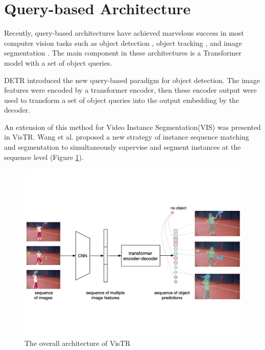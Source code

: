 \section{Query-based Architecture}
Recently, query-based architectures have achieved marvelous success in most computer vision tasks such as object detection \cite{carion_end--end_2020}, object tracking \cite{meinhardt_trackformer_2022}, and image segmentation \cite{cheng_masked-attention_2022, cheng_per-pixel_2021}. The main component in these architectures is a Transformer model with a set of object queries. 

\vspace{-2mm}
DETR \cite{carion_end--end_2020} introduced the new query-based paradigm for object detection. The image features were encoded by a transformer encoder, then these encoder output were used to transform a set of object queries into the output embedding by the decoder. 

\vspace{-2mm}
An extension of this method for Video Instance Segmentation(VIS) was presented in VisTR. Wang et al. \cite{wang_end--end_2021} proposed a new strategy of instance sequence matching and segmentation to simultaneously supervise and segment instances at the sequence level (Figure \ref{fig:vistr}). 

\begin{figure}[b!]
    \centering
    \includegraphics[width=\textwidth]{content/resources/images/VisTR.pdf}
    \caption{The overall architecture of VisTR \cite{wang_end--end_2021} }
    \label{fig:vistr}
\end{figure}

